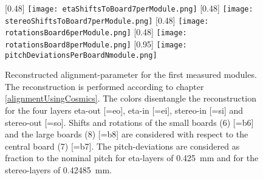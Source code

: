 \documentclass[
twoside,            %
BCOR1.4cm,          %
10pt,               %
headings=normal,    %
headsepline,        %
clearplainpage,		%
final,              %
div=14,
open=right,
bibliography=toc
]{scrreprt}
\begin{document}
\begin{figure}[!h]
	\centering
	[0.48\textwidth]
	{\texttt{[image: etaShiftsToBoard7perModule.png]}}
	\hfill
	[0.48\textwidth]
	{\texttt{[image: stereoShiftsToBoard7perModule.png]}}
	\hfill
	[0.48\textwidth]
	{\texttt{[image: rotationsBoard6perModule.png]}}
	\hfill
	[0.48\textwidth]
	{\texttt{[image: rotationsBoard8perModule.png]}}
	\hfill
	[0.95\textwidth]
	{\texttt{[image: pitchDeviationsPerBoardNmodule.png]}}
	\vspace{-2mm}
	\caption{
		Reconstructed alignment-parameter for the first measured modules.
		The reconstruction is performed according to chapter \ref{alignmentUsingCosmics}.
		The colors disentangle the reconstruction for the four layers eta-out [=eo], eta-in [=ei], stereo-in [=si] and stereo-out [=so].
		Shifts and rotations of the small boards (6) [=b6] and the large boards (8) [=b8] are considered with respect to the central board (7) [=b7].
		The pitch-deviations are considered as fraction to the nominal pitch for eta-layers of \SI{0.425}{mm} and for the stereo-layers of \SI{0.42485}{mm}.
	}
	\label{reconstructedAlignmentParameter_plot} 
\end{figure}

\end{document}
